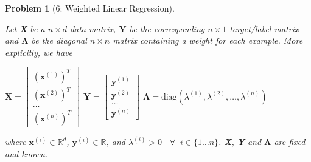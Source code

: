 \documentclass[11pt]{exam}
\theoremstyle{quest}
\newtheorem*{question}{Problem}
\begin{document}
\begin{question}[6: Weighted Linear Regression]
~

Let \textbf{X} be a $n\times d$ data matrix, $\textbf{Y}$ be the corresponding
$n\times 1$ target/label matrix and $\boldsymbol{\Lambda}$ be the diagonal
$n\times n$ matrix containing a weight for each example. More explicitly, we
have

\begin{minipage}{\textwidth}
\hfill
$\textbf{X} = \left[ \begin{matrix} (\textbf{x}^{(1)})^T \\
    (\textbf{x}^{(2)})^T \\ \dots \\ (\textbf{x}^{(n)})^T \end{matrix}
\right]$
\hfill
$\textbf{Y} = \left[ \begin{matrix} \textbf{y}^{(1)} \\ \textbf{y}^{(2)} \\
    \dots \\ \textbf{y}^{(n)} \end{matrix} \right]$
\hfill
$\boldsymbol{\Lambda} = \text{diag}(\lambda^{(1)},\lambda^{(2)},\dots,\lambda^{(n)})$
\hspace{5em}
\end{minipage}

where $\textbf{x}^{(i)} \in \mathbb{R}^d$, $\textbf{y}^{(i)} \in \mathbb{R}$,
and $\lambda^{(i)} > 0$
$\;\;\forall\;\;i\in\{1\dots n\}$. \textbf{X}, \textbf{Y} and $\boldsymbol{\Lambda}$ are fixed and known.


\end{question}
\end{document}
